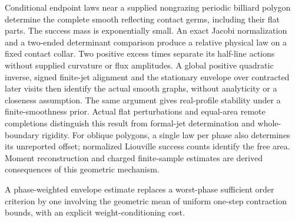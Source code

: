 Conditional endpoint laws near a supplied nongrazing periodic billiard
polygon determine the complete smooth reflecting contact germs, including
their flat parts.  The success mass is exponentially small.  An exact
Jacobi normalization and a two-ended determinant comparison produce a
relative physical law on a fixed contact collar.  Two positive excess
times separate its half-line actions without supplied curvature or flux
amplitudes.  A global positive quadratic inverse, signed finite-jet
alignment and the stationary envelope over contracted later visits then
identify the actual smooth graphs, without analyticity or a closeness
assumption.  The same argument gives real-profile stability under a
finite-smoothness prior.  Actual flat perturbations and equal-area remote
completions distinguish this result from formal-jet determination and
whole-boundary rigidity.  For oblique polygons, a single law per phase
also determines its unreported offset; normalized Liouville success counts
identify the free area.  Moment reconstruction and charged finite-sample
estimates are derived consequences of this geometric mechanism.

A phase-weighted envelope estimate replaces a worst-phase sufficient
order criterion by one involving the geometric mean of uniform one-step
contraction bounds, with an explicit weight-conditioning cost.
